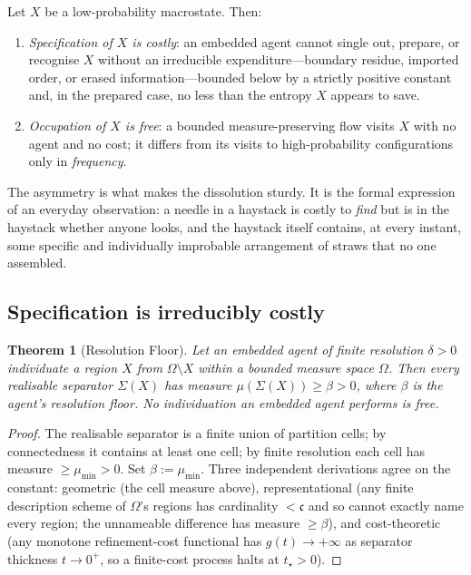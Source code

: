 \documentclass[twocolumn,10pt,a4paper]{article}
\theoremstyle{thmstyle}
\newtheorem{theorem}{Theorem}[section]
\theoremstyle{definition}
\theoremstyle{remark}
\begin{document}
\begin{principle}
\label{prin:asym}
Let $X$ be a low-probability macrostate. Then:
\begin{enumerate}[nosep,leftmargin=*]
\item \emph{Specification of $X$ is costly}: an embedded agent cannot
single out, prepare, or recognise $X$ without an irreducible
expenditure---boundary residue, imported order, or erased
information---bounded below by a strictly positive constant and, in
the prepared case, no less than the entropy $X$ appears to save.
\item \emph{Occupation of $X$ is free}: a bounded measure-preserving
flow visits $X$ with no agent and no cost; it differs from its visits
to high-probability configurations only in \emph{frequency}.
\end{enumerate}
\end{principle}

The asymmetry is what makes the dissolution sturdy. It is the formal
expression of an everyday observation: a needle in a haystack is
costly to \emph{find} but is in the haystack whether anyone looks,
and the haystack itself contains, at every instant, some specific
and individually improbable arrangement of straws that no one
assembled.

\subsection{Specification is irreducibly costly}

\begin{theorem}[Resolution Floor]
\label{thm:floor}
Let an embedded agent of finite resolution $\delta>0$ individuate a
region $X$ from $\Omega\setminus X$ within a bounded measure space
$\Omega$. Then every realisable separator $\Sigma(X)$ has measure
$\mu(\Sigma(X))\geq\beta>0$, where $\beta$ is the agent's
\emph{resolution floor}. No individuation an embedded agent performs
is free.
\end{theorem}

\begin{proof}
The realisable separator is a finite union of partition cells; by
connectedness it contains at least one cell; by finite resolution
each cell has measure $\geq\mu_{\min}>0$. Set
$\beta:=\mu_{\min}$. Three independent derivations agree on the
constant: geometric (the cell measure above), representational
(any finite description scheme of $\Omega$'s regions has cardinality
$<\mathfrak{c}$ and so cannot exactly name every region; the
unnameable difference has measure $\geq\beta$), and cost-theoretic
(any monotone refinement-cost functional has
$g(t)\to+\infty$ as separator thickness $t\to 0^{+}$, so a
finite-cost process halts at $t_{\star}>0$).
\end{proof}
\end{document}
